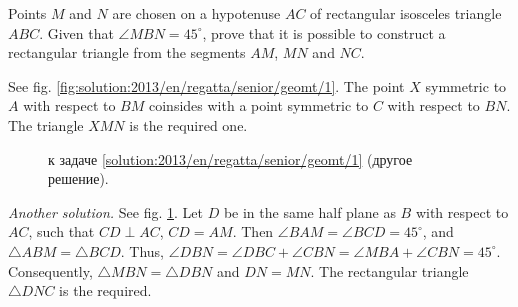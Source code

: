 \problem
Points $M$ and $N$ are chosen on a hypotenuse $AC$ of rectangular isosceles
triangle $ABC$.
Given that $\angle MBN = 45^\circ$, prove that it is possible to construct a
rectangular triangle from the segments $AM$, $MN$ and $NC$.

%
\label{solution:2013/en/regatta/senior/geomt/1}%
See fig. \ref{fig:solution:2013/en/regatta/senior/geomt/1}.
The point $X$ symmetric to $A$ with respect to $BM$ coinsides with a point
symmetric to $C$ with respect to $BN$.
The triangle $XMN$ is the required one.
\par
\begin{figure}
\centering
\caption{к задаче \ref{solution:2013/en/regatta/senior/geomt/1}
    (другое решение).}
\label{fig:solution:2013/en/regatta/senior/geomt/1/another}
\end{figure}%
\emph{Another solution.}
See fig. \ref{fig:solution:2013/en/regatta/senior/geomt/1/another}.
Let $D$ be in the same half plane as $B$ with respect to $AC$, such that
$CD \perp AC$, $CD = AM$.
Then $\angle BAM = \angle BCD = 45^\circ$, and $\triangle ABM = \triangle BCD$.
Thus,
\(
    \angle DBN = \angle DBC + \angle CBN
=
    \angle MBA + \angle CBN = 45^\circ
\).
Consequently, $\triangle MBN = \triangle DBN$ and $DN = MN$.
The rectangular triangle $\triangle DNC$ is the required.
\endproblem
